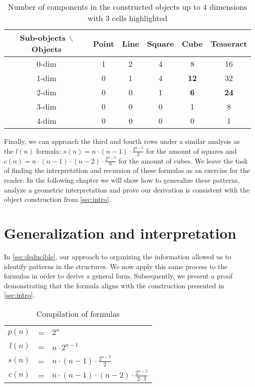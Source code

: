 \documentclass{article}
\begin{document}
	\begin{table}[ht]
		\centering
		\begin{tabular}{||c || c c c c c||}
			\hline
			Sub-objects $\backslash$ Objects & Point & Line & Square & Cube & Tesseract \cite{coxeter1973regular}\\\hline\hline
			0-dim & 1 & 2 & 4 & 8  & 16\\\hline
			1-dim & 0 & 1 & 4 & \textbf{12} & 32\\\hline
			2-dim & 0 & 0 & 1 & \textbf{6}  & \textbf{24}\\\hline
			3-dim & 0 & 0 & 0 & 1  & 8 \\\hline
			4-dim & 0 & 0 & 0 & 0  & 1\\\hline
		\end{tabular}
		\caption{Number of components in the constructed objects up to 4 dimensions with 3 cells highlighted}
		\label{4d_objects_table}
	\end{table}
	
	Finally, we can approach the third and fourth rows under a similar analysis as the $l(n)$ formula: $s(n) = n\cdot(n-1)\cdot\frac{2^{n-2}}{2}$ for the amount of squares and $c(n) = n\cdot(n-1)\cdot(n-2)\cdot\frac{2^{n-3}}{6}$ for the amount of cubes. We leave the task of finding the interpretation and recursion of these formulas as an exercise for the reader. In the following chapter we will show how to generalize these patterns, analyze a geometric interpretation and prove our derivation is consistent with the object construction from \autoref{sec:intro}.
	
	\section{Generalization and interpretation \label{sec:generalization}}
	
	In \autoref{sec:deducible}, our approach to organizing the information allowed us to identify patterns in the structures. We now apply this same process to the formulas in order to derive a general form. Subsequently, we present a proof demonstrating that the formula aligns with the construction presented in \autoref{sec:intro}.
	
	\begin{table}[ht]
		\centering
		\begin{tabular}{r c l}
			
			$p(n)$ & = &$ 2^{n}$ \\[0.7ex]
			$l(n)$ & = &$ n \cdot 2^{n-1}$ \\[0.4ex]
			$s(n)$ & = &$ n\cdot(n-1)\cdot\frac{2^{n-2}}{2}$\\[0.4ex]
			$c(n)$ & = &$ n \cdot (n-1) \cdot (n-2) \cdot \frac{2^{n-3}}{2 \cdot 3}$%
		\end{tabular}
		\caption{Compilation of formulas}
		\label{resume_table}
	\end{table}
	
\end{document}
